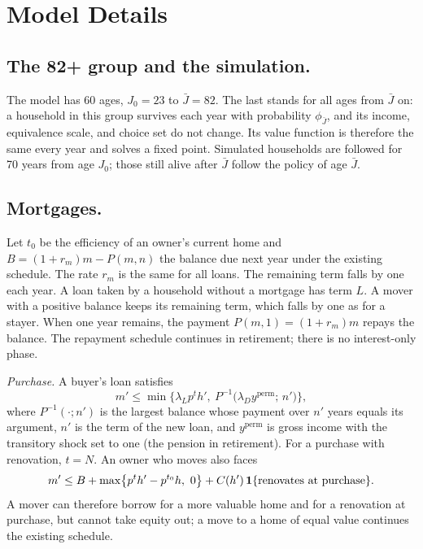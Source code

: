 \section{Model Details}\label{app:model}

\subsection{The 82+ group and the simulation.}\label{app:model-terminal}
The model has 60 ages, $J_0=23$ to $\bar J=82$. The last stands for all
ages from $\bar J$ on: a household in this group survives each year with
probability $\phi_{\bar J}$, and its income, equivalence scale, and choice
set do not change. Its value function is therefore the same every year and
solves a fixed point. Simulated households are followed for 70 years from
age $J_0$; those still alive after $\bar J$ follow the policy of age $\bar J$.

\subsection{Mortgages.}\label{app:model-mortgages}
Let $t_0$ be the efficiency of an owner's current home and
$B=(1+r_m)m-P(m,n)$ the balance due next year under the existing
schedule. The rate $r_m$ is the same for all loans. The remaining term falls by one
each year. A loan taken by a household without a mortgage has term $L$. A
mover with a positive balance keeps its remaining term, which falls by one
as for a stayer. When one year remains, the payment
$P(m,1)=(1+r_m)m$ repays the balance. The repayment schedule continues
in retirement; there is no interest-only phase.

\emph{Purchase.} A buyer's loan satisfies
\begin{equation*}
  m'\leq\min\bigl\{\lambda_Lp^th',\ P^{-1}\bigl(\lambda_Dy^{\mathrm{perm}};\,n'\bigr)\bigr\},
\end{equation*}
where $P^{-1}(\cdot;n')$ is the largest balance whose payment over $n'$
years equals its argument, $n'$ is the term of the new loan, and $y^{\mathrm{perm}}$ is
gross income with the transitory shock set to one (the pension in
retirement). For a purchase with renovation, $t=N$. An owner who moves
also faces
\begin{equation*}
  m'\leq B+\max\bigl\{p^th'-p^{t_0}h,\ 0\bigr\}+C(h')\,\mathbf 1\{\text{renovates at purchase}\}.
\end{equation*}
A mover can therefore borrow for a more valuable home and for a renovation
at purchase, but cannot take equity out; a move to a home of equal value
continues the existing schedule.

